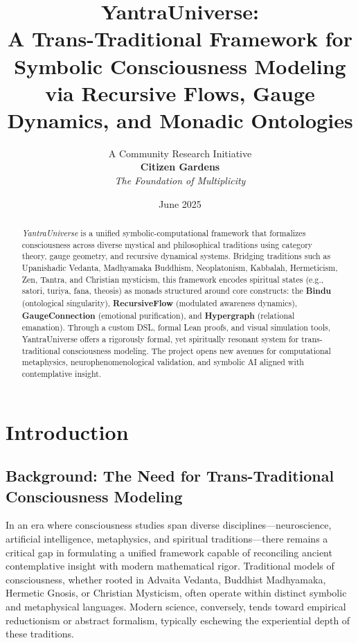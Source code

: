 \documentclass[12pt]{article}
\title{\textbf{YantraUniverse:\\ A Trans-Traditional Framework for Symbolic Consciousness Modeling via Recursive Flows, Gauge Dynamics, and Monadic Ontologies}}
\author{\large A Community Research Initiative \\ \textbf{ Citizen Gardens} \\ \textit {The Foundation of Multiplicity}}
\date{June 2025}
\theoremstyle{plain}
\begin{document}
\maketitle

\begin{abstract}
\noindent
\textit{YantraUniverse} is a unified symbolic-computational framework that formalizes consciousness across diverse mystical and philosophical traditions using category theory, gauge geometry, and recursive dynamical systems. Bridging traditions such as Upanishadic Vedanta, Madhyamaka Buddhism, Neoplatonism, Kabbalah, Hermeticism, Zen, Tantra, and Christian mysticism, this framework encodes spiritual states (e.g., satori, turiya, fana, theosis) as monads structured around core constructs: the \textbf{Bindu} (ontological singularity), \textbf{RecursiveFlow} (modulated awareness dynamics), \textbf{GaugeConnection} (emotional purification), and \textbf{Hypergraph} (relational emanation). Through a custom DSL, formal Lean proofs, and visual simulation tools, YantraUniverse offers a rigorously formal, yet spiritually resonant system for trans-traditional consciousness modeling. The project opens new avenues for computational metaphysics, neurophenomenological validation, and symbolic AI aligned with contemplative insight.
\end{abstract}

\newpage
\section{Introduction}

\subsection{Background: The Need for Trans-Traditional Consciousness Modeling}

In an era where consciousness studies span diverse disciplines—neuroscience, artificial intelligence, metaphysics, and spiritual traditions—there remains a critical gap in formulating a unified framework capable of reconciling ancient contemplative insight with modern mathematical rigor. Traditional models of consciousness, whether rooted in Advaita Vedanta, Buddhist Madhyamaka, Hermetic Gnosis, or Christian Mysticism, often operate within distinct symbolic and metaphysical languages. Modern science, conversely, tends toward empirical reductionism or abstract formalism, typically eschewing the experiential depth of these traditions. 
\end{document}
